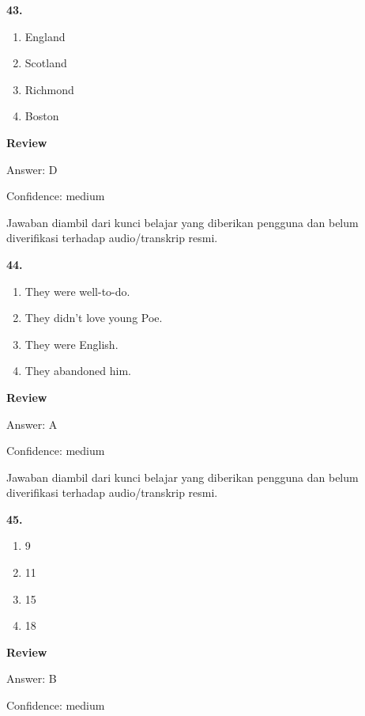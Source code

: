 \documentclass[12pt]{article}
\begin{document}
\noindent\textbf{43.}
\begin{enumerate}[label=(\Alph*),leftmargin=*,itemsep=0.2em]
\item England
\item Scotland
\item Richmond
\item Boston
\end{enumerate}
\par
\begingroup
\setlength{\parskip}{0pt}
\setlength{\parindent}{0pt}
\textbf{Review}\par
Answer: D\par
Confidence: medium\par
Jawaban diambil dari kunci belajar yang diberikan pengguna dan belum diverifikasi terhadap audio/transkrip resmi.\par
\endgroup
\par
\vspace{0.25\baselineskip}
\noindent\textbf{44.}
\begin{enumerate}[label=(\Alph*),leftmargin=*,itemsep=0.2em]
\item They were well-to-do.
\item They didn't love young Poe.
\item They were English.
\item They abandoned him.
\end{enumerate}
\par
\begingroup
\setlength{\parskip}{0pt}
\setlength{\parindent}{0pt}
\textbf{Review}\par
Answer: A\par
Confidence: medium\par
Jawaban diambil dari kunci belajar yang diberikan pengguna dan belum diverifikasi terhadap audio/transkrip resmi.\par
\endgroup
\par
\vspace{0.25\baselineskip}
\noindent\textbf{45.}
\begin{enumerate}[label=(\Alph*),leftmargin=*,itemsep=0.2em]
\item 9
\item 11
\item 15
\item 18
\end{enumerate}
\par
\begingroup
\setlength{\parskip}{0pt}
\setlength{\parindent}{0pt}
\textbf{Review}\par
Answer: B\par
Confidence: medium\par
\end{document}

